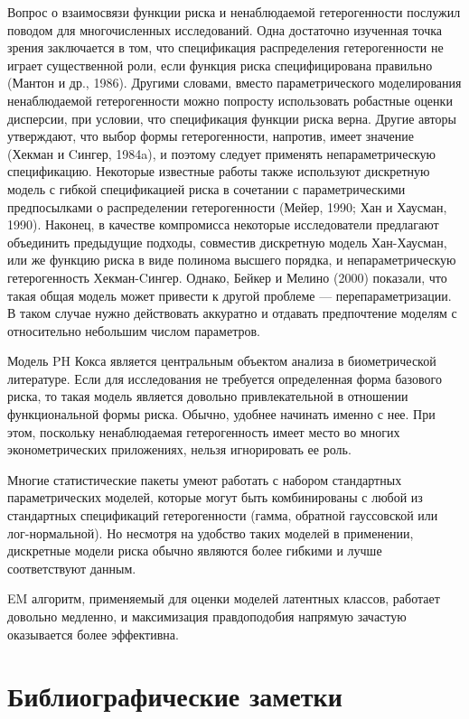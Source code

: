 \noindent
Вопрос о взаимосвязи функции риска и ненаблюдаемой гетерогенности послужил поводом для многочисленных исследований. Одна достаточно изученная точка зрения заключается в том, что спецификация распределения гетерогенности не играет существенной роли, если функция риска специфицирована правильно (Мантон и др., 1986). Другими словами, вместо параметрического моделирования ненаблюдаемой гетерогенности можно попросту использовать робастные оценки дисперсии, при условии, что спецификация функции риска верна. Другие авторы утверждают, что выбор формы гетерогенности, напротив, имеет значение (Хекман и Cингер, 1984a), и поэтому следует применять непараметрическую спецификацию. Некоторые известные работы также используют дискретную модель с гибкой спецификацией риска в сочетании с параметрическими предпосылками о распределении гетерогенности (Мейер, 1990; Хан и Хаусман, 1990). Наконец, в качестве компромисса некоторые исследователи предлагают объединить предыдущие подходы, совместив дискретную модель Хан-Хаусман, или же функцию риска в виде полинома высшего порядка, и непараметрическую гетерогенность Хекман-Cингер. Однако, Бейкер и Мелино (2000) показали, что такая общая модель может привести к другой проблеме --- перепараметризации. В таком случае нужно действовать аккуратно и отдавать предпочтение моделям с относительно небольшим числом параметров.

Модель PH Кокса является центральным объектом анализа в биометрической литературе. Если для исследования не требуется определенная форма базового риска, то такая модель является довольно привлекательной в отношении функциональной формы риска. Обычно, удобнее начинать именно с нее. При этом, поскольку ненаблюдаемая гетерогенность имеет место во многих эконометрических приложениях, нельзя игнорировать ее роль.

Многие статистические пакеты умеют работать с набором стандартных параметрических моделей, которые могут быть комбинированы с любой из стандартных спецификаций гетерогенности (гамма, обратной гауссовской или лог-нормальной). Но несмотря на удобство таких моделей в применении, дискретные модели риска обычно являются более гибкими и лучше соответствуют данным.

EM алгоритм, применяемый для оценки моделей латентных классов, работает довольно медленно, и максимизация правдоподобия напрямую зачастую оказывается более эффективна.




\section{Библиографические заметки}\label{sec:18.10}

